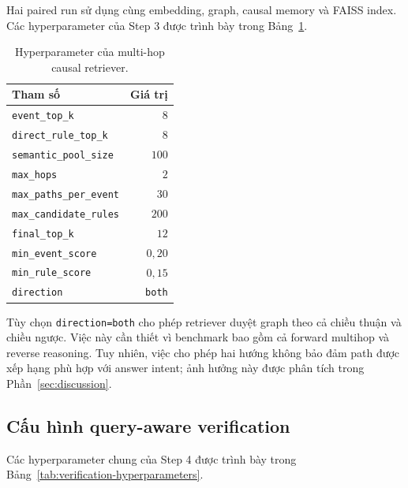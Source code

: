 Hai paired run sử dụng cùng embedding, graph, causal memory và FAISS index.
Các hyperparameter của Step 3 được trình bày trong
Bảng~\ref{tab:retrieval-hyperparameters}.

\begin{table}[t]
    \centering
    \caption{Hyperparameter của multi-hop causal retriever.}
    \label{tab:retrieval-hyperparameters}
    \begin{tabular}{lr}
        \hline
        \textbf{Tham số} & \textbf{Giá trị} \\
        \hline
        \texttt{event\_top\_k} & \(8\) \\
        \texttt{direct\_rule\_top\_k} & \(8\) \\
        \texttt{semantic\_pool\_size} & \(100\) \\
        \texttt{max\_hops} & \(2\) \\
        \texttt{max\_paths\_per\_event} & \(30\) \\
        \texttt{max\_candidate\_rules} & \(200\) \\
        \texttt{final\_top\_k} & \(12\) \\
        \texttt{min\_event\_score} & \(0{,}20\) \\
        \texttt{min\_rule\_score} & \(0{,}15\) \\
        \texttt{direction} & \texttt{both} \\
        \hline
    \end{tabular}
\end{table}

Tùy chọn \texttt{direction=both} cho phép retriever duyệt graph theo cả chiều
thuận và chiều ngược. Việc này cần thiết vì benchmark bao gồm cả forward
multihop và reverse reasoning. Tuy nhiên, việc cho phép hai hướng không bảo
đảm path được xếp hạng phù hợp với answer intent; ảnh hưởng này được phân
tích trong Phần~\ref{sec:discussion}.

\subsection{Cấu hình query-aware verification}

Các hyperparameter chung của Step 4 được trình bày trong
Bảng~\ref{tab:verification-hyperparameters}.


